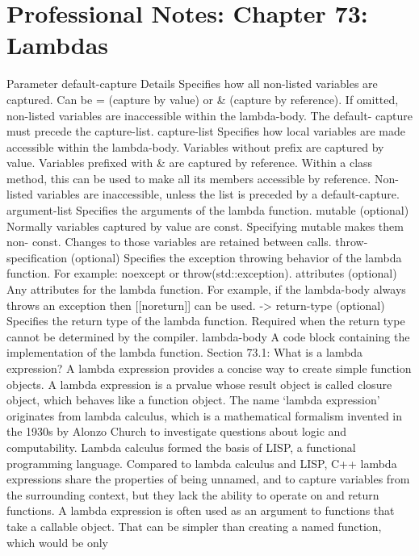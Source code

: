 \hypertarget{professional-notes-chapter-73-lambdas-1}{%
\chapter{Professional Notes: Chapter 73:
Lambdas}\label{professional-notes-chapter-73-lambdas-1}}

Parameter default-capture Details Speciﬁes how all non-listed variables
are captured. Can be = (capture by value) or \& (capture by reference).
If omitted, non-listed variables are inaccessible within the
lambda-body. The default- capture must precede the capture-list.
capture-list Speciﬁes how local variables are made accessible within the
lambda-body. Variables without preﬁx are captured by value. Variables
preﬁxed with \& are captured by reference. Within a class method, this
can be used to make all its members accessible by reference. Non-listed
variables are inaccessible, unless the list is preceded by a
default-capture. argument-list Speciﬁes the arguments of the lambda
function. mutable (optional) Normally variables captured by value are
const. Specifying mutable makes them non- const. Changes to those
variables are retained between calls. throw-speciﬁcation (optional)
Speciﬁes the exception throwing behavior of the lambda function. For
example: noexcept or throw(std::exception). attributes (optional) Any
attributes for the lambda function. For example, if the lambda-body
always throws an exception then {[}{[}noreturn{]}{]} can be used.
-\textgreater{} return-type (optional) Speciﬁes the return type of the
lambda function. Required when the return type cannot be determined by
the compiler. lambda-body A code block containing the implementation of
the lambda function. Section 73.1: What is a lambda expression? A lambda
expression provides a concise way to create simple function objects. A
lambda expression is a prvalue whose result object is called closure
object, which behaves like a function object. The name `lambda
expression' originates from lambda calculus, which is a mathematical
formalism invented in the 1930s by Alonzo Church to investigate
questions about logic and computability. Lambda calculus formed the
basis of LISP, a functional programming language. Compared to lambda
calculus and LISP, C++ lambda expressions share the properties of being
unnamed, and to capture variables from the surrounding context, but they
lack the ability to operate on and return functions. A lambda expression
is often used as an argument to functions that take a callable object.
That can be simpler than creating a named function, which would be only
